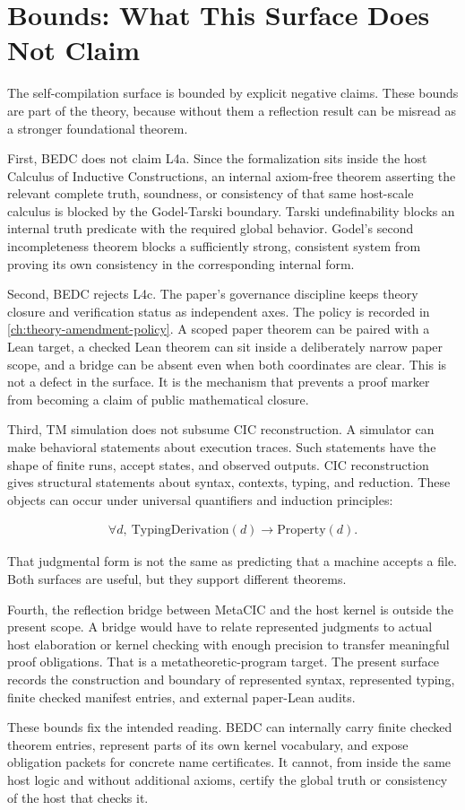 \section{Bounds: What This Surface Does Not Claim}\label{sec:self-comp-not-claimed}

The self-compilation surface is bounded by explicit negative claims. These
bounds are part of the theory, because without them a reflection result can be
misread as a stronger foundational theorem.

First, BEDC does not claim L4a. Since the formalization sits inside the host
Calculus of Inductive Constructions, an internal axiom-free theorem asserting
the relevant complete truth, soundness, or consistency of that same host-scale
calculus is blocked by the Godel-Tarski boundary. Tarski undefinability blocks
an internal truth predicate with the required global behavior. Godel's second
incompleteness theorem blocks a sufficiently strong, consistent system from
proving its own consistency in the corresponding internal form.

Second, BEDC rejects L4c. The paper's governance discipline keeps theory
closure and verification status as independent axes. The policy is recorded in
\autoref{ch:theory-amendment-policy}. A scoped paper theorem can be paired with
a Lean target, a checked Lean theorem can sit inside a deliberately narrow
paper scope, and a bridge can be absent even when both coordinates are clear.
This is not a defect in the surface. It is the mechanism that prevents a proof
marker from becoming a claim of public mathematical closure.

Third, TM simulation does not subsume CIC reconstruction. A simulator can make
behavioral statements about execution traces. Such statements have the shape of
finite runs, accept states, and observed outputs. CIC reconstruction gives
structural statements about syntax, contexts, typing, and reduction. These
objects can occur under universal quantifiers and induction principles:

$$
\begin{aligned}
\forall d,\ \mathrm{TypingDerivation}(d)
  \longrightarrow \mathrm{Property}(d).
\end{aligned}
$$

That judgmental form is not the same as predicting that a machine accepts a
file. Both surfaces are useful, but they support different theorems.

Fourth, the reflection bridge between MetaCIC and the host kernel is outside
the present scope. A bridge would have to relate represented judgments to actual
host elaboration or kernel checking with enough precision to transfer
meaningful proof obligations. That is a metatheoretic-program target.
The present surface records the construction and boundary of represented
syntax, represented typing, finite checked manifest entries, and external
paper-Lean audits.

These bounds fix the intended reading. BEDC can internally carry finite checked
theorem entries, represent parts of its own kernel vocabulary, and expose
obligation packets for concrete name certificates. It cannot, from inside the
same host logic and without additional axioms, certify the global truth or
consistency of the host that checks it.
